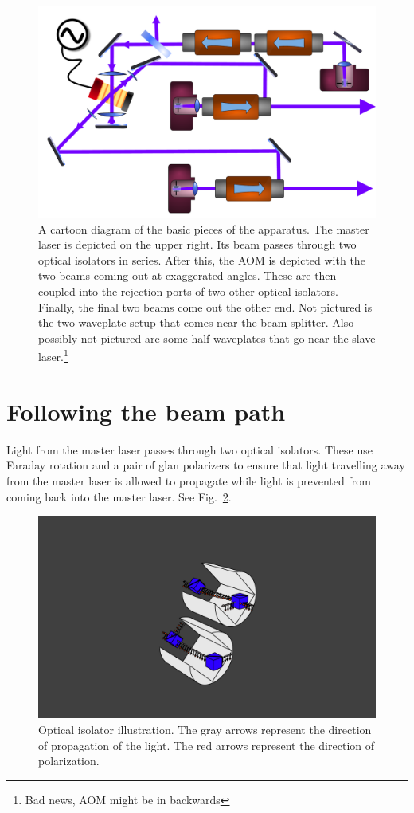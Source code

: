 \begin{figure}
    \centerline{\includegraphics[width=1\textwidth]{diagramOfSetup3}}
    \caption[Diagram of the Setup]{\label{diagramOfSetup3}
	A cartoon diagram of the basic pieces of the apparatus. The master laser is depicted on the upper right. Its beam passes through two optical isolators in series. After this, the AOM is depicted with the two beams coming out at exaggerated angles. These are then coupled into the rejection ports of two other optical isolators. Finally, the final two beams come out the other end. Not pictured is the two waveplate setup that comes near the beam splitter. Also possibly not pictured are some half waveplates that go near the slave laser.\footnote{Bad news, AOM might be in backwards} 
    }
\end{figure}
\section{Following the beam path}
Light from the master laser passes through two optical isolators. These use Faraday rotation and a pair of glan polarizers to ensure that light travelling away from the master laser is allowed to propagate while light is prevented from coming back into the master laser. See Fig.~\ref{isolatorPicture}.

\begin{figure}
\centerline{\includegraphics[width=1\textwidth]{isolators}}
\caption[Optical Isolator Illustration]{\label{isolatorPicture}Optical isolator illustration. The gray arrows represent the direction of propagation of the light. The red arrows represent the direction of polarization.}
\end{figure}

